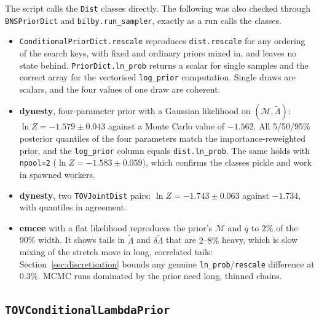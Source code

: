 \documentclass[11pt,a4paper]{article}
\newcommand{\Mc}{\mathcal{M}}
\newcommand{\lt}{\tilde{\Lambda}}
\newcommand{\dlt}{\delta\tilde{\Lambda}}
\newcommand{\code}[1]{\texttt{#1}}
\begin{document}
The script calls the \code{Dist} classes directly. The following was also
checked through \code{BNSPriorDict} and \code{bilby.run\_sampler}, exactly as a
run calls the classes.
\begin{itemize}
  \item \code{ConditionalPriorDict.rescale} reproduces \code{dist.rescale} for
    any ordering of the search keys, with fixed and ordinary priors mixed in,
    and leaves no state behind. \code{PriorDict.ln\_prob} returns a scalar for
    single samples and the correct array for the vectorised
    \code{log\_prior} computation. Single draws are scalars, and the four
    values of one draw are coherent.
  \item \textbf{dynesty}, four-parameter prior with a Gaussian likelihood on
    $(\Mc, \lt)$: $\ln Z = -1.579 \pm 0.043$ against a Monte Carlo value of
    $-1.562$. All 5/50/95\% posterior quantiles of the four parameters match
    the importance-reweighted prior, and the \code{log\_prior} column equals
    \code{dist.ln\_prob}. The same holds with \code{npool=2}
    ($\ln Z = -1.583 \pm 0.059$), which confirms the classes pickle and work
    in spawned workers.
  \item \textbf{dynesty}, two \code{TOVJointDist} pairs:
    $\ln Z = -1.743 \pm 0.063$ against $-1.734$, with quantiles in agreement.
  \item \textbf{emcee} with a flat likelihood reproduces the prior's $\Mc$ and
    $q$ to $2\%$ of the 90\% width. It shows tails in $\lt$ and $\dlt$ that are
    $2$--$8\%$ heavy, which is slow mixing of the stretch move in long,
    correlated tails: Section~\ref{sec:discretisation} bounds any genuine
    \code{ln\_prob}/\code{rescale} difference at $0.3\%$. MCMC runs dominated by
    the prior need long, thinned chains.
\end{itemize}
\subsection{\code{TOVConditionalLambdaPrior}}
\label{sec:verify_conditional}
\end{document}
